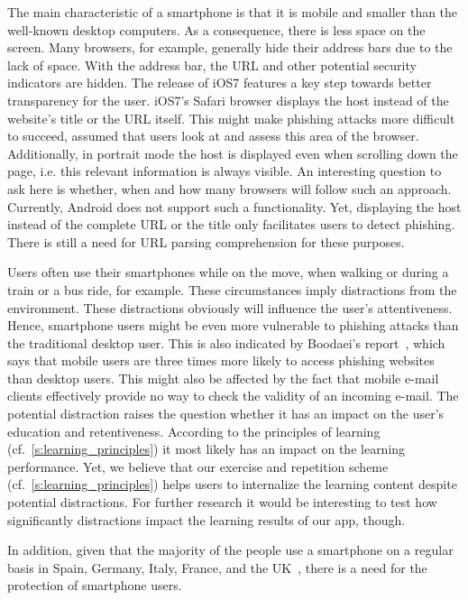 \begin{description}[leftmargin=0cm]
	\item[Mobility and Size:] The main characteristic of a smartphone is that it is mobile and smaller than the well-known desktop computers.
 As a consequence, there is less space on the screen.
 Many browsers, for example, generally hide their address bars due to the lack of space.
 With the address bar, the URL and other potential security indicators are hidden.
The release of iOS7 features a key step towards better transparency for the user.
iOS7's Safari browser displays the host instead of the website's title or the URL itself.
This might make phishing attacks more difficult to succeed, assumed that users look at and assess this area of the browser.
Additionally, in portrait mode the host is displayed even when scrolling down the page, i.e. this relevant information is always visible.
An interesting question to ask here is whether, when and how many browsers will follow such an approach.
Currently, Android does not support such a functionality. 
Yet, displaying the host instead of the complete URL or the title only facilitates users to detect phishing.
There is still a need for URL parsing comprehension for these purposes.
	\item[Distraction Caused by Mobility:] Users often use their smartphones while on the move, when walking or during a train or a bus ride, for example.
 These circumstances imply distractions from the environment.
 These distractions obviously will influence the user's attentiveness.
 Hence, smartphone users might be even more vulnerable to phishing attacks than the traditional desktop user.
 This is also indicated by Boodaei's report~\cite{trusteer2011}, which says that mobile users are three times more likely to access phishing websites than desktop users.
 This might also be affected by the fact that mobile e-mail clients effectively provide no way to check the validity of an incoming e-mail.
The potential distraction raises the question whether it has an impact on the user's education and retentiveness.
According to the principles of learning (cf.~\autoref{s:learning_principles}) it most likely has an impact on the learning performance.
Yet, we believe that our exercise and repetition scheme (cf.~\autoref{s:learning_principles}) helps users to internalize the learning content despite potential distractions.
For further research it would be interesting to test how significantly distractions impact the learning results of our app, though.
	\item[High Number of Smartphone Users:] In addition, given that the majority of the people use a smartphone on a regular basis in Spain, Germany, Italy, France, and the UK~\cite{smartphoneusage}, there is a need for the protection of smartphone users.

\end{description} 
